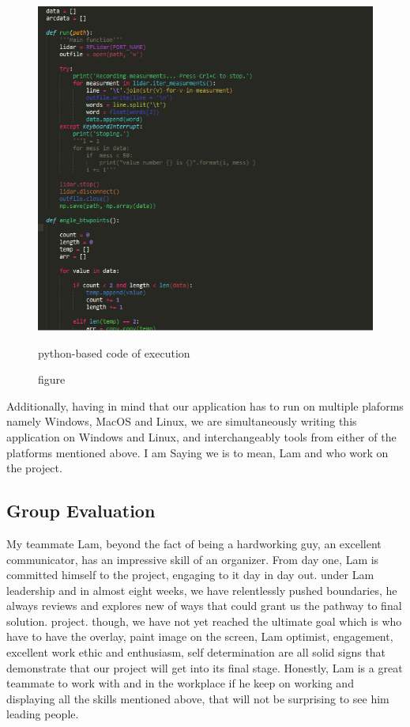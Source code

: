 \documentclass[10pt,draftclsnofoot,onecolumn,journal,compsoc]{IEEEtran}
\begin{document}
\begin{singlespace}
    	\begin{figure}[ht]
    	\centering
    	 \includegraphics[width=4.5in,natwidth=2000,natheight=100]{images/snapcode.png}
    	\caption{figure}{  python-based code of execution}
    	\end{figure}
    
   \pagebreak 
   	
Additionally, having in mind that our application has to run on multiple plaforms namely Windows, MacOS and Linux, we are simultaneously  writing this application on Windows and Linux, and interchangeably tools from either of the  platforms mentioned above. 
I am Saying we is to mean, Lam and who work on the project.		
	
	\subsection{Group Evaluation}
		My teammate Lam, beyond the fact of being a hardworking guy, an excellent communicator, has an impressive skill of an organizer. From day one, Lam is committed himself to the project, engaging to it day in day out.
		under Lam leadership and in almost eight weeks, we have relentlessly pushed  boundaries, he always reviews and explores new of ways that could grant us the pathway to final solution.   project.
		though, we have not yet  reached the ultimate goal which is who have to have the overlay, paint image on the screen, Lam optimist, engagement, excellent work ethic and enthusiasm, self determination are all solid signs  that demonstrate that our project will get into its final stage.
		Honestly, Lam is a great teammate to work with and in the workplace if he keep on  working and displaying all the skills mentioned above, that will not be surprising to see him leading people. 
		

\end{singlespace}
\end{document}

